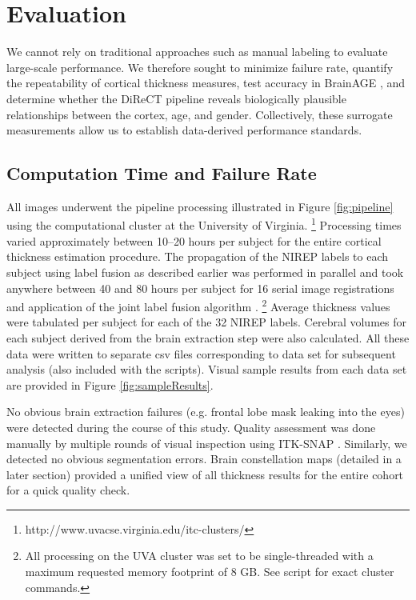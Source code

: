 \section{Evaluation}
We cannot rely on traditional approaches such as manual
labeling to evaluate large-scale performance.  We therefore sought to
minimize failure rate, quantify the repeatability of cortical
thickness measures, test accuracy in BrainAGE \citep{franke2010}, and
determine whether the DiReCT pipeline reveals biologically plausible relationships
between the cortex, age, and gender.  Collectively, these surrogate
measurements allow us to establish data-derived performance standards.

\subsection{Computation Time and Failure Rate}
All images underwent the pipeline processing illustrated in Figure 
\ref{fig:pipeline} using the computational cluster at the University 
of Virginia.%
\footnote{
http://www.uvacse.virginia.edu/itc-clusters/
}  
Processing times varied approximately between 10--20 hours per subject
for the entire cortical thickness estimation procedure.  The propagation of the
NIREP labels to each subject using label fusion as described earlier
was performed in parallel and took anywhere between 40 and 80 hours per 
subject for 16 serial image registrations and application of the joint label fusion algorithm \citep{wang2013}.%
\footnote{
All processing on the UVA cluster was set to be single-threaded with a maximum requested memory footprint of 8 GB.  See script for exact cluster commands.
}  
Average thickness values were tabulated per subject for each of the
32 NIREP labels.  Cerebral volumes for each subject derived from the brain 
extraction step were also calculated.  All these data were written to separate csv
files corresponding to data set for subsequent 
analysis (also included with the scripts).  Visual sample results from each data set are provided in 
Figure \ref{fig:sampleResults}.

No obvious brain extraction failures (e.g. frontal lobe mask leaking into 
the eyes) were detected during the course of this study.  
Quality assessment was done manually by multiple rounds of visual inspection using 
ITK-SNAP \cite{yushkevich2006}.  Similarly, we detected no obvious segmentation errors.  Brain constellation maps (detailed in a later section)
provided a unified view of all thickness results for the entire cohort for
a quick quality check.


